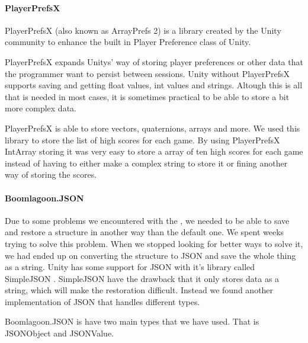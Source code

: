 \paragraph{PlayerPrefsX}
PlayerPrefsX (also known as ArrayPrefs 2)\cite{PlayerPrefsX} is a library created by the Unity community to enhance the built in Player Preference class of Unity.

PlayerPrefsX expands Unitys' way of storing player preferences or other data that the programmer want to persist between sessions.
Unity without PlayerPrefsX supports saving and getting float values, int values and strings. Altough this is all that is needed in most cases, it is sometimes practical to be able to store a bit more complex data.

PlayerPrefsX is able to store vectors, quaternions, arrays and more. 
We used this library to store the list of high scores for each game. 
By using PlayerPrefsX IntArray storing it was very easy to store a array of ten high scores for each game instead of having to either make a complex string to store it or fining another way of storing the scores.

\paragraph{Boomlagoon.{JSON}}
Due to some problems we encountered with the ,
we needed to be able to save and restore a structure in another way than the
default one. We spent weeks trying to solve this problem. When we stopped
looking for better ways to solve it, we had ended up on converting the 
structure to {JSON} and save the whole thing as a string.
Unity has some support for {JSON} with it's library called Simple{JSON} 
\cite{SimpleJSON}. Simple{JSON} have the drawback that it only stores data
as a string, which will make the restoration difficult. Instead we found
another implementation of JSON that handles different types.

Boomlagoon.{JSON} is have two main types that we have used. That is 
{JSONO}bject and {JSONV}alue.

